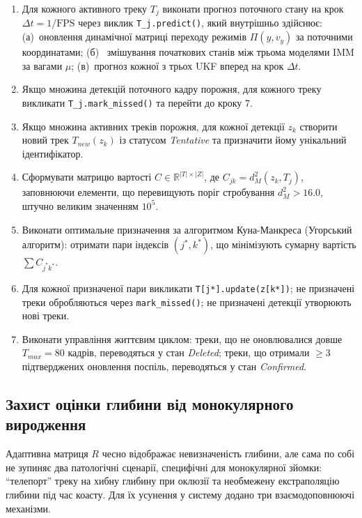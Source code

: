 \begin{enumerate}
    \item Для кожного активного треку $T_j$ виконати прогноз поточного стану на крок $\Delta t = 1/\text{FPS}$ через виклик
    \texttt{T\_j.predict()}, який внутрішньо здійснює: (а)~оновлення динамічної матриці переходу режимів $\Pi(y, v_y)$
    за поточними координатами; (б)~ змішування початкових станів між трьома моделями \gls{IMM} за вагами $\mu$; (в)~прогноз
    кожної з трьох \gls{UKF} вперед на крок $\Delta t$.
    \item Якщо множина детекцій поточного кадру порожня, для кожного треку викликати \texttt{T\_j.mark\_missed()} та
    перейти до кроку 7.
    \item Якщо множина активних треків порожня, для кожної детекції $z_k$ створити новий трек $T_{new}(z_k)$ із статусом
    \textit{Tentative} та призначити йому унікальний ідентифікатор.
    \item Сформувати матрицю вартості $C \in \mathbb{R}^{|T| \times |Z|}$, де $C_{jk} = d_M^2(z_k, T_j)$, заповнюючи
    елементи, що перевищують поріг стробування $d_M^2 > 16.0$, штучно великим значенням $10^5$.
    \item Виконати оптимальне призначення за алгоритмом Куна-Манкреса (Угорський алгоритм): отримати пари
    індексів $(j^*, k^*)$, що мінімізують сумарну вартість $\sum C_{j^*k^*}$.
    \item Для кожної призначеної пари викликати \texttt{T[j*].update(z[k*])}; не призначені треки обробляються через
    \texttt{mark\_missed()}; не призначені детекції утворюють нові треки.
    \item Виконати управління життєвим циклом: треки, що не оновлювалися довше $T_{max} = 80$ кадрів,
    переводяться у стан \textit{Deleted}; треки, що отримали $\geq 3$ підтверджених оновлення поспіль, переводяться у стан
    \textit{Confirmed}.
\end{enumerate}

\subsection{Захист оцінки глибини від монокулярного виродження}

Адаптивна матриця $R$ чесно відображає невизначеність глибини, але сама по собі
не зупиняє два патологічні сценарії, специфічні для монокулярної зйомки:
``телепорт'' треку на хибну глибину при оклюзії та необмежену екстраполяцію
глибини під час коасту. Для їх усунення у систему додано три взаємодоповнюючі
механізми.


